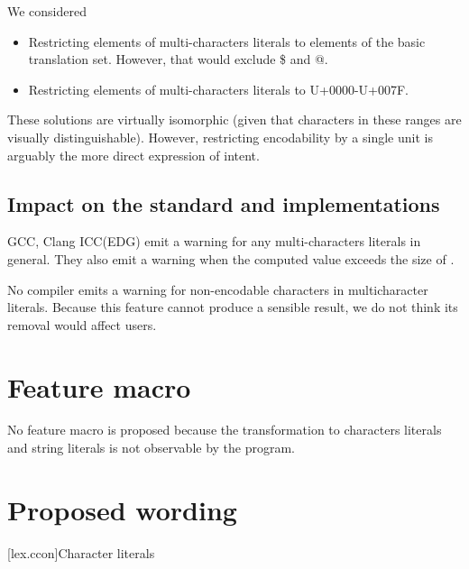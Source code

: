 \documentclass{wg21}
\begin{document}
    We considered
    \begin{itemize}
        \item Restricting elements of multi-characters literals to elements of the basic translation set. However, that would exclude \$ and @.
        \item Restricting elements of multi-characters literals to U+0000-U+007F.
    \end{itemize}
    
    These solutions are virtually isomorphic (given that characters in these ranges are visually distinguishable). However, restricting encodability by a single unit is arguably the more direct expression of intent.
    
    
    \subsection{Impact on the standard and implementations}
    
    GCC, Clang ICC(EDG) emit a warning for any multi-characters literals in general. They also emit a warning when the computed value exceeds the size of . 
    
    No compiler emits a warning for non-encodable characters in multicharacter literals.
    Because this feature cannot produce a sensible result, we do not think its removal would affect users.
    
    \section{Feature macro}
    
    No feature macro is proposed because the transformation to characters literals and string literals is not observable by the program.
    
    
    \section{Proposed wording}
    
    
    
    [lex.ccon]{Character literals}
    
\end{document}
